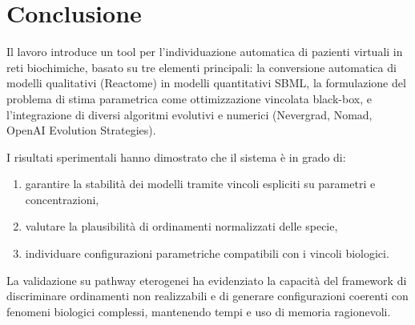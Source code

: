 \chapter{Conclusione}

Il lavoro introduce un tool per l'individuazione automatica di pazienti virtuali
in reti biochimiche, basato su tre elementi principali: 
la conversione automatica di modelli qualitativi (Reactome) 
in modelli quantitativi SBML, la formulazione del 
problema di stima parametrica come ottimizzazione vincolata black-box,
 e l'integrazione di diversi algoritmi evolutivi e numerici 
 (Nevergrad, Nomad, OpenAI Evolution Strategies).

I risultati sperimentali hanno dimostrato che il sistema è in grado di:
\begin{enumerate}
    \item 	garantire la stabilità dei modelli tramite vincoli espliciti su parametri e concentrazioni,
	\item 	valutare la plausibilità di ordinamenti normalizzati delle specie,
	\item 	individuare configurazioni parametriche compatibili con i vincoli biologici.
\end{enumerate}

La validazione su pathway eterogenei ha evidenziato 
la capacità del framework di discriminare ordinamenti 
non realizzabili e di generare configurazioni coerenti 
con fenomeni biologici complessi, mantenendo tempi e uso di memoria ragionevoli.

